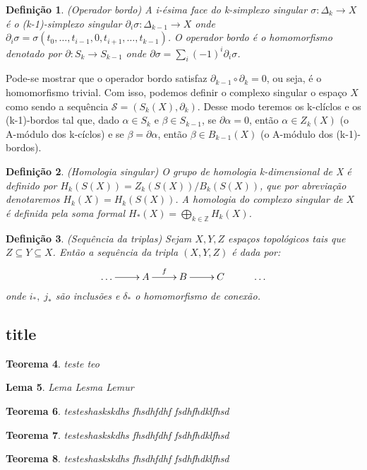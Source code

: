 \documentclass[twoside,openright,titlepage,numbers=noenddot,headinclude,  lineheaders footinclude=true,cleardoublepage=empty,
                                BCOR=5mm,paper=a4,fontsize=12pt ]{scrbook}
\newtheorem{teo}{Teorema}[chapter]
\newtheorem{lema}[teo]{Lema}
\newtheorem{defn}[teo]{Definição}
\begin{document}
\begin{defn}
	(Operador bordo) A i-ésima face do k-simplexo singular $\sigma: \Delta_{k} \to X$ é o (k-1)-simplexo singular $\partial_{i}\sigma:\Delta_{k-1} \to X$ onde $\partial_{i}\sigma = \sigma(t_{0}, \dots, t_{i-1},0,t_{i+1}, \dots, t_{k-1})$. O operador bordo é o homomorfismo denotado por $\partial : S_{k} \to S_{k-1}$ onde $\partial\sigma = \sum_{i} (-1)^{i}\partial_{i}\sigma$.
\end{defn}
Pode-se mostrar que o operador bordo satisfaz $\partial_{k-1}\circ\partial_{k} = 0$, ou seja, é o homomorfismo trivial. Com isso, podemos definir o complexo singular o espaço $X$ como sendo a sequência $\mathcal{S} = (S_{k}(X), \partial_{k})$. Desse modo teremos os k-clíclos e os (k-1)-bordos tal que, dado $\alpha \in S_{k}$ e $\beta \in S_{k-1}$, se $\partial\alpha = 0$, então $\alpha \in Z_{k}(X)$ (o A-módulo dos k-cíclos) e se $\beta = \partial\alpha$, então $\beta\in B_{k-1}(X)$ (o A-módulo dos (k-1)-bordos).

\begin{defn}
	(Homologia singular) O grupo de homologia k-dimensional de X é definido por $H_{k}(S(X)) = Z_{k}(S(X))/B_{k}(S(X))$, que por abreviação denotaremos $H_{k}(X)=H_{k}(S(X))$. A homologia do complexo singular de $X$ é definida pela soma formal $H_{*}(X) = \bigoplus_{k \in \mathbb{Z}}H_{k}(X)$.
\end{defn}

\begin{defn}
	(Sequência da triplas) Sejam $X, Y, Z$ espaços topológicos tais que $Z \subseteq Y \subseteq X$. Então a sequência da tripla $(X,Y,Z)$ é dada por:
	$$
	\xymatrix{
		\dots \ar[r] & A \ar[r]^{f} & B \ar[r] & C & \dots
	}
	$$
	onde $i_{*},\;j_{*}$ são inclusões e $\delta_{*}$ o homomorfismo de conexão.
\end{defn}


\subsection{title}
\begin{teo}
 teste teo \blindtext 
\end{teo}
\begin{lema}
 Lema Lesma Lemur
\end{lema}

\begin{teo}
 testeshaskskdhs fhsdhfdhf fsdhfhdklfhsd
\end{teo}
\begin{teo}
 testeshaskskdhs fhsdhfdhf fsdhfhdklfhsd
\end{teo}\begin{teo}
 testeshaskskdhs fhsdhfdhf fsdhfhdklfhsd
\end{teo}
\end{document}
